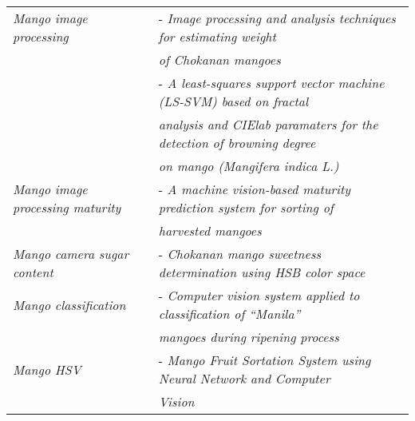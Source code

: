 \begin{center}
\begin{longtable}{ll}

\textit{Mango image processing}				& - \textit{Image processing and analysis techniques for estimating weight} \\
											& \textit{of Chokanan mangoes} \\ 
											& - \textit{A least-squares support vector machine (LS-SVM) based on fractal}  \\ 
											& \textit{analysis and CIElab paramaters for the detection of browning degree} \\ 
											& \textit{on mango (Mangifera indica L.)} \\ \hline

\textit{Mango image processing maturity}	& - \textit{A machine vision-based maturity prediction system for sorting of} \\
											&	\textit{harvested mangoes} \\ \hline

\textit{Mango camera sugar content}			& - \textit{Chokanan mango sweetness determination using HSB color space} \\ \hline

\textit{Mango classification} 				& - \textit{Computer vision system applied to classification of “Manila”} \\
											& 	\textit{mangoes during ripening process} \\ \hline

\textit{Mango HSV}							& - \textit{Mango Fruit Sortation System using Neural Network and Computer} \\
											& 	\textit{Vision} \\ \hline


\end{longtable}
\end{center}
